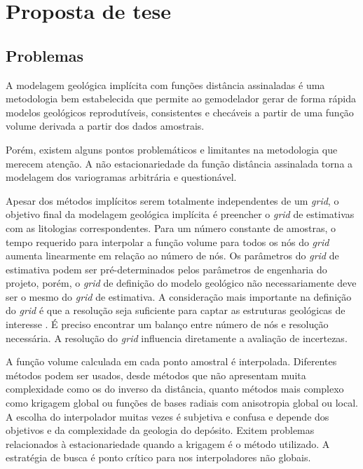 \chapter{Proposta de tese}

\section{Problemas}\label{problemas}

A modelagem geológica implícita com funções distância assinaladas é uma metodologia bem estabelecida que permite ao gemodelador gerar de forma rápida modelos geológicos reprodutíveis, consistentes e checáveis a partir de uma função volume derivada a partir dos dados amostrais. 

Porém, existem alguns pontos problemáticos e limitantes na metodologia que merecem atenção. A não estacionariedade da função distância assinalada torna a modelagem dos variogramas arbitrária e questionável.

Apesar dos métodos implícitos serem totalmente independentes de um \textit{grid}, o objetivo final da modelagem geológica implícita é preencher o \textit{grid} de estimativas com as litologias correspondentes. Para um número constante de amostras, o tempo requerido para interpolar a função volume para todos os nós do \textit{grid} aumenta linearmente em relação ao número de nós. Os parâmetros do \textit{grid} de estimativa podem ser pré-determinados pelos parâmetros de engenharia do projeto, porém, o \textit{grid} de definição do modelo geológico não necessariamente deve ser o mesmo do \textit{grid} de estimativa. A consideração mais importante na definição do \textit{grid} é que a resolução seja suficiente para captar as estruturas geológicas de interesse \cite{martin2017implicitmodeling}. É preciso encontrar um balanço entre número de nós e resolução necessária. A resolução do \textit{grid} influencia diretamente a avaliação de incertezas.

A função volume calculada em cada ponto amostral é interpolada. Diferentes métodos podem ser usados, desde métodos que não apresentam muita complexidade como os do inverso da distância, quanto métodos mais complexo como krigagem global ou funções de bases radiais com anisotropia global ou local. A escolha do interpolador muitas vezes é subjetiva e confusa e depende dos objetivos e da complexidade da geologia do depósito. Exitem problemas relacionados à estacionariedade quando a krigagem é o método utilizado. A estratégia de busca é ponto crítico para nos interpoladores não globais.

